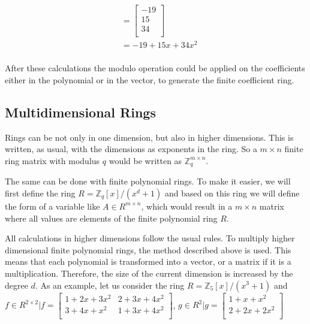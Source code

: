 \begin{align*}
{  }                                                                           \\
                 & = \begin{bmatrix}
                       -19 \\
                       15  \\
                       34  \\
                     \end{bmatrix}                                           \\
                 & = -19+15x+34x^2                                            \\                     
\end{align*}

After these calculations the modulo operation could be applied on the coefficients either in the polynomial or in the vector, to generate the finite coefficient ring.

\subsection*{Multidimensional Rings}

Rings can be not only in one dimension, but also in higher dimensions. This is written, as usual, with the dimensions as exponents in the ring. So a $m \times n$ finite ring matrix with modulus $q$ would be written as $\mathbb{Z}^{m\times n}_q$.

The same can be done with finite polynomial rings. To make it easier, we will first define the ring $R = \mathbb{Z}_q[x]/(x^d+1)$ and based on this ring we will define the form of a variable like $A \in R^{m\times n}$, which would result in a $m \times n$ matrix where all values are elements of the finite polynomial ring $R$.

All calculations in higher dimensions follow the usual rules. To multiply higher dimensional finite polynomial rings, the method described above is used. This means that each polynomial is transformed into a vector, or a matrix if it is a multiplication. Therefore, the size of the current dimension is increased by the degree $d$. As an example, let us consider the ring $R = \mathbb{Z}_5[x]/(x^3+1)$ and $f \in R^{2\times 2} | f=\begin{bmatrix}
    1+2x+3x^2 & 2+3x+4x^2 \\
    3+4x+x^2  & 1+3x+4x^2 \\
  \end{bmatrix}$, $g \in R^2 | g = \begin{bmatrix}
    1+x+x^2   \\
    2+2x+2x^2 \\
  \end{bmatrix}$

